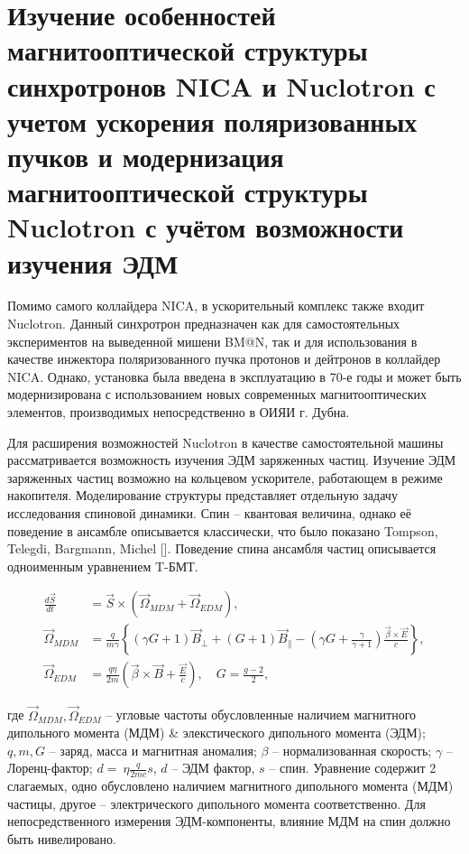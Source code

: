 
	\chapter{Изучение особенностей магнитооптической структуры синхротронов NICA и Nuclotron с учетом ускорения поляризованных пучков и модернизация магнитооптической структуры Nuclotron с учётом возможности изучения ЭДМ}\label{ch:EDM}

\par Помимо самого коллайдера NICA, в ускорительный комплекс также входит Nuclotron. Данный синхротрон предназначен как для самостоятельных экспериментов на выведенной мишени BM@N, так и для использования в качестве инжектора поляризованного пучка протонов и дейтронов в коллайдер NICA. Однако, установка была введена в эксплуатацию в 70-е годы и может быть модернизирована с использованием новых современных магнитооптических элементов, производимых непосредственно в ОИЯИ г. Дубна.

\par Для расширения возможностей Nuclotron в качестве самостоятельной машины рассматривается возможность изучения ЭДМ заряженных частиц. Изучение ЭДМ заряженных частиц возможно на кольцевом ускорителе, работающем в режиме накопителя. Моделирование структуры представляет отдельную задачу исследования спиновой динамики. Спин – квантовая величина, однако её поведение в ансамбле описывается классически, что было показано Tompson, Telegdi, Bargmann, Michel []. Поведение спина ансамбля частиц описывается одноименным уравнением T-БМТ. 

\begin{align} \label{eq:T-BMT}
\frac{{d \vec{S}}}{d t} &=\vec{S} \times\left(\vec{\Omega}_{MDM}+\vec{\Omega}_{EDM}\right), \nonumber\\
\vec{\Omega}_{MDM}&=\frac{q}{m \gamma}\left\{(\gamma G+1)\vec{B}_{\perp}+(G+1)\vec{B}_{\parallel}-\left(\gamma G+\frac{\gamma}{\gamma+1}\right) \frac{\vec{\beta} \times \vec{E}}{c}\right\}, \\
\vec{\Omega}_{EDM}&=\frac{q \eta}{2 m}\left(\vec{\beta} \times \vec{B}+\frac{\vec{E}}{c}\right), \quad G=\frac{g-2}{2},\nonumber
\end{align}

\noindent где $\vec{\Omega}_{MDM}, \vec{\Omega}_{EDM}$ -- угловые частоты обусловленные наличием магнитного дипольного момента (МДМ) \& элекстического дипольного момента (ЭДМ); $q, m, G$ -- заряд, масса и магнитная аномалия; $\beta$ -- нормализованная скорость; $\gamma$ -- Лоренц-фактор; $d =~\eta \frac{q}{2mc}s$, $d$ -- ЭДМ фактор, $s$ -- спин. Уравнение содержит 2 слагаемых, одно обусловлено наличием магнитного дипольного момента (МДМ) частицы, другое – электрического дипольного момента соответственно. Для непосредственного измерения ЭДМ-компоненты, влияние МДМ на спин должно быть нивелировано.

